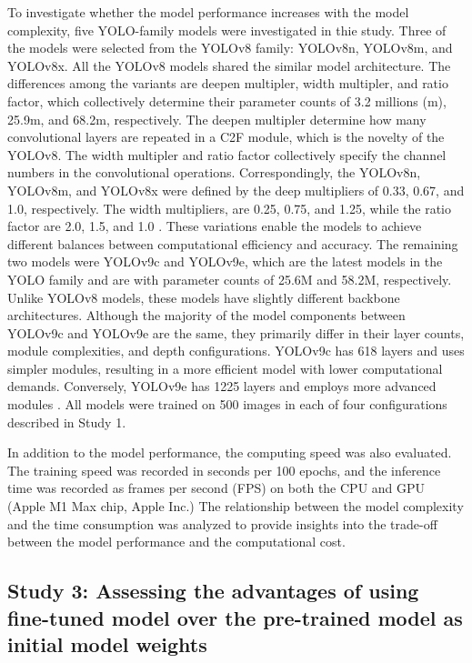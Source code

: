 To investigate whether the model performance increases with the model complexity, five YOLO-family models were investigated in thie study. Three of the models were selected from the YOLOv8 family: YOLOv8n, YOLOv8m, and YOLOv8x. All the YOLOv8 models shared the similar model architecture. The differences among the variants are deepen multipler, width multipler, and ratio factor, which collectively determine their parameter counts of 3.2 millions (m), 25.9m, and 68.2m, respectively. The deepen multipler determine how many convolutional layers are repeated in a C2F module, which is the novelty of the YOLOv8. The width multipler and ratio factor collectively specify the channel numbers in the convolutional operations. Correspondingly, the YOLOv8n, YOLOv8m, and YOLOv8x were defined by the deep multipliers of 0.33, 0.67, and 1.0, respectively. The width multipliers, are 0.25, 0.75, and 1.25, while the ratio factor are 2.0, 1.5, and 1.0 \citep{}. These variations enable the models to achieve different balances between computational efficiency and accuracy. The remaining two models were YOLOv9c and YOLOv9e, which are the latest models in the YOLO family and are with parameter counts of 25.6M and 58.2M, respectively.  Unlike YOLOv8 models, these models have slightly different backbone architectures. Although the majority of the model components between YOLOv9c and YOLOv9e are the same, they primarily differ in their layer counts, module complexities, and depth configurations. YOLOv9c has 618 layers and uses simpler modules, resulting in a more efficient model with lower computational demands. Conversely, YOLOv9e has 1225 layers and employs more advanced modules \citep{}. All models were trained on 500 images in each of four configurations described in Study 1.

In addition to the model performance, the computing speed was also evaluated. The training speed was recorded in seconds per 100 epochs, and the inference time was recorded as frames per second (FPS) on both the CPU and GPU (Apple M1 Max chip, Apple Inc.) The relationship between the model complexity and the time consumption was analyzed to provide insights into the trade-off between the model performance and the computational cost.

\subsection*{Study 3: Assessing the advantages of using fine-tuned model over the pre-trained model as initial model weights}

